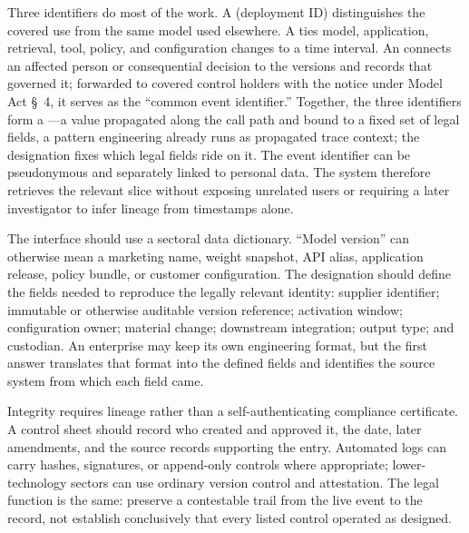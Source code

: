 Three identifiers do most of the work. A  (deployment ID) distinguishes the covered use from the same model used elsewhere. A  ties model, application, retrieval, tool, policy, and configuration changes to a time interval. An  connects an affected person or consequential decision to the versions and records that governed it; forwarded to covered control holders with the notice under Model Act \S~4, it serves as the ``common event identifier.'' Together, the three identifiers form a ---a value propagated along the call path and bound to a fixed set of legal fields, a pattern engineering already runs as propagated trace context; the designation fixes which legal fields ride on it. The event identifier can be pseudonymous and separately linked to personal data. The system therefore retrieves the relevant slice without exposing unrelated users or requiring a later investigator to infer lineage from timestamps alone.

The interface should use a sectoral data dictionary. ``Model version'' can otherwise mean a marketing name, weight snapshot, API alias, application release, policy bundle, or customer configuration. The designation should define the fields needed to reproduce the legally relevant identity: supplier identifier; immutable or otherwise auditable version reference; activation window; configuration owner; material change; downstream integration; output type; and custodian. An enterprise may keep its own engineering format, but the first answer translates that format into the defined fields and identifies the source system from which each field came.

Integrity requires lineage rather than a self-authenticating compliance certificate. A control sheet should record who created and approved it, the date, later amendments, and the source records supporting the entry. Automated logs can carry hashes, signatures, or append-only controls where appropriate; lower-technology sectors can use ordinary version control and attestation. The legal function is the same: preserve a contestable trail from the live event to the record, not establish conclusively that every listed control operated as designed.

